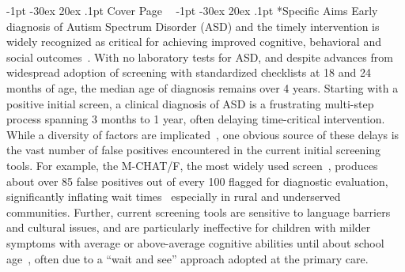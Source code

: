 \documentclass[onecolumn, compsoc,11pt]{IEEEtran}
\makeatletter
\renewcommand\section{\@startsection {section}{1}{\z@}%
                                   {-1pt \@plus -30ex \@minus 20ex}%
                                   {.1pt}%
                                   {\large\bfseries\scshape}}
\makeatother
\begin{document}
 
\section{Cover Page}
\clearpage
$\phantom{x}$
\vspace{-35pt}  
\section*{Specific Aims}
\setcounter{section}{1}
Early diagnosis of Autism Spectrum Disorder (ASD) and the timely  intervention is widely recognized as critical for achieving improved cognitive, behavioral and social outcomes~\cite{hyman2020identification}. With no laboratory tests for ASD, and despite advances from widespread adoption of screening with standardized checklists at 18 and 24 months of age, the median age of diagnosis remains over 4 years.  Starting with a positive initial screen, a clinical diagnosis of ASD is  a  frustrating multi-step process spanning 3 months to 1 year, often delaying  time-critical intervention. While a diversity of factors are implicated~\cite{kalb2012determinants,bisgaier2011access,fenikile2015barriers,pmid27565363}, one obvious source of these delays  is the vast number of false positives encountered in the current initial  screening tools. For example, the  M-CHAT/F, the most widely used  screen~\cite{robins2014validation,hyman2020identification},  produces about   over 85 false positives out of every 100   flagged for  diagnostic evaluation, significantly inflating wait times~\cite{pmid27565363} especially in rural and underserved communities.
Further, current  screening tools are sensitive to language barriers and cultural issues, and are  particularly ineffective for children with milder symptoms  with average or above-average cognitive abilities until about school age~\cite{jashar2016cognitive,hyman2020identification}, often due to a ``wait and see'' approach adopted at the primary care.
\end{document}
